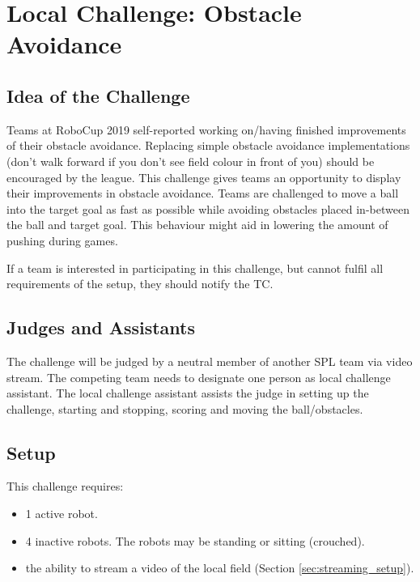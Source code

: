 \section{Local Challenge: Obstacle Avoidance}
\label{sec:ObstacleAvoidance}

\subsection{Idea of the Challenge}

Teams at RoboCup 2019 self-reported working on/having finished improvements of their obstacle avoidance. Replacing simple obstacle avoidance implementations (don't walk forward if you don't see field colour in front of you) should be encouraged by the league. This challenge gives teams an opportunity to display their improvements in obstacle avoidance. Teams are challenged to move a ball into the target goal as fast as possible while avoiding obstacles placed in-between the ball and target goal. This behaviour might aid in lowering the amount of pushing during games.

If a team is interested in participating in this challenge, but cannot fulfil all requirements of the setup, they should notify the TC.

\subsection{Judges and Assistants}

The challenge will be judged by a neutral member of another SPL team via video stream. The competing team needs to designate one person as local challenge assistant. The local challenge assistant assists the judge in setting up the challenge, starting and stopping, scoring and moving the ball/obstacles.

\subsection{Setup}

This challenge requires:
\begin{itemize}
	\item 1 active robot.
	\item 4 inactive robots. The robots may be standing or sitting (crouched).
	\item the ability to stream a video of the local field (\cf Section \ref{sec:streaming_setup}).
\end{itemize}

